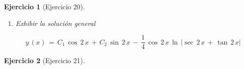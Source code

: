 \documentclass[a4paper,11pt, openany]{book}
\newtheorem{ejer}{Ejercicio}[section]
\newcommand*{\itembolasazules}[1]{%
\footnotesize\protect\tikz[baseline=-3pt]%
\protect\node[scale=.7, circle, shade, ball
color=green]{\color{white}\Large\bf#1};}
\begin{document}
\begin{ejer}[Ejercicio 20]
\begin{enumerate}[label=\itembolasazules{\arabic*}]
\begin{tcolorbox}[colback=brown!5!white,colframe=brown!75!black,fonttitle=\bfseries,title=$I_{1}$]
$$\displaystyle\,\int\,\left(\sin\,2\,x\,\textcolor{britishracinggreen}{\times}\,\tan\,2\,x  \right)\,d\,x\,=\,\boxed{\dfrac{1}{2}\,\ln\,|\sec\,2\,x\,+\,\tan\,2\,x|\,-\,\dfrac{1}{2}\,\sin\,2\,x}$$
 
\end{tcolorbox}
 
\begin{tcolorbox}[colback=brown!5!white,colframe=brown!75!black,fonttitle=\bfseries,title=$I_{2}$]
 
$$\displaystyle\,\int\,\left(\cos\,2\,x\,\textcolor{britishracinggreen}{\times}\,\tan\,2\,x  \right)\,d\,x\,=\,\displaystyle\,\int\,\left(\cos\,2\,x\,\textcolor{britishracinggreen}{\times}\,\dfrac{\sen\,2\,x}{\cos\,2\,x}  \right)\,d\,x$$
 
$$\displaystyle\,\int\,\left(\cos\,2\,x\,\textcolor{britishracinggreen}{\times}\,\tan\,2\,x  \right)\,d\,x\,=\,\displaystyle\,\int\,\sin\,2\,x\,d\,x$$
 
$$\displaystyle\,\int\,\left(\cos\,2\,x\,\textcolor{britishracinggreen}{\times}\,\tan\,2\,x  \right)\,d\,x\,=\,\boxed{-\,\dfrac{1}{2}\,\cos\,2\,x}$$
 
\end{tcolorbox}
 
$$y_{P}\,(x)\,=\,-\,\dfrac{1}{2}\,\cos\,2\,x\,\left(\dfrac{1}{2}\,\ln\,|\sec\,2\,x\,+\,\tan\,2\,x|\,-\,\dfrac{1}{2}\,\sin\,2\,x \right)\,+\,\dfrac{1}{2}\,\sin\,2\,x\,\left(-\,\dfrac{1}{2}\,\cos\,2\,x \right)$$
 
$$y_{P}\,(x)\,=\,-\,\dfrac{1}{4}\,\cos\,2\,x\,\ln\,|\sec\,2\,x\,+\,\tan\,2\,x|\,+\,\dfrac{1}{4}\,\sin\,2\,x\,\cos\,2\,x\,-\,\dfrac{1}{4}\,\sin\,2\,x\,\cos\,2\,x$$
 
$$\boxed{y_{P}\,(x)\,=\,-\,\dfrac{1}{4}\,\cos\,2\,x\,\ln\,|\sec\,2\,x\,+\,\tan\,2\,x|}$$
 
\item Exhibir la solución general
 
$$\boxed{y\,(x)\,=\,C_{1}\,\cos\,2\,x\,+\,C_{2}\,\sin\,2\,x\,-\,\dfrac{1}{4}\,\cos\,2\,x\,\ln\,|\sec\,2\,x\,+\,\tan\,2\,x|}$$
 
\end{enumerate}

\end{ejer}
 
\begin{ejer}[Ejercicio 21]
 
\end{ejer}
 
\end{document}
